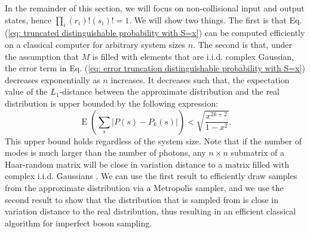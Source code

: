 \documentclass[10pt,aps,pra,twocolumn,superscriptaddress]{revtex4-2}
\DeclareMathOperator{\E}{E}
\begin{document}
In the remainder of this section, we will focus on non-collisional input and output states, hence $\prod_i (r_i)! (s_i)!=1$. We will show two things. The first is that Eq. (\ref{eq: truncated distinguishable probability with S=x}) can be computed efficiently on a classical computer for arbitrary system sizes $n$. The second is that, under the assumption that $M$ is filled with elements that are i.i.d. complex Gaussian, the error term in Eq. (\ref{eq: error truncation distinguishable probability with S=x}) decreases exponentially as $n$ increases. It decreases such that, the expectation value of the $L_1$-distance between the approximate distribution and the real distribution is upper bounded by the following expression:
\begin{equation}
    \E\left(\sum_s |P(s)-P_k(s)|\right)<\sqrt{\frac{x^{2k+2}}{1-x^2}}.
    \label{eq: upper bound}
\end{equation}
This upper bound holds regardless of the system size.
Note that if the number of modes is much larger than the number of photons, any $n\times n$ submatrix of a Haar-random matrix will be close in variation distance to a matrix filled with complex i.i.d. Gaussians \cite{Aaronson_Arkhipov_BS}.
We can use the first result to efficiently draw samples from the approximate distribution via a Metropolis sampler, and we use the second result to show that the distribution that is sampled from is close in variation distance to the real distribution, thus resulting in an efficient classical algorithm for imperfect boson sampling. 
\end{document}

